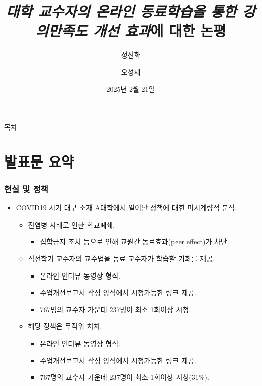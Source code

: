 \documentclass[aspectratio=169,xcolor=dvipsnames,handout]{beamer}
\title{\textit{대학 교수자의 온라인 동료학습을 통한 강의만족도 개선 효과}에 대한 논평}
\subtitle{정진화}
\author{오성재}
\institute[KIHASA]
    {\relax
        2024--25년 SSK 네트워킹 제3차 합동 심포지엄
    }
\date{2025년 2월 21일}
\begin{document}

\frame{\titlepage}

\begin{frame}{목차}
    \tableofcontents
\end{frame}

\section{발표문 요약}

\begin{frame}
    \frametitle{현실 및 정책}
    \begin{itemize}[<+->]
        \item  COVID19 시기 대구 소재 A대학에서 일어난 정책에 대한 미시계량적 분석.
        \begin{itemize}
            \item 전염병 사태로 인한 학교폐쇄.
            \begin{itemize}
               \item 집합금지 조치 등으로 인해 교원간 동료효과(peer effect)가 차단.
            \end{itemize}
            \item 직전학기 교수자의 교수법을 동료 교수자가 학습할 기회를 제공.
            \begin{itemize}
               \item 온라인 인터뷰 동영상 형식.
               \item 수업개선보고서 작성 양식에서 시청가능한 링크 제공.
               \item 767명의 교수자 가운데 237명이 최소 1회이상 시청.
            \end{itemize}
            \item 해당 정책은 무작위 처치.
            \begin{itemize}
               \item 온라인 인터뷰 동영상 형식.
               \item 수업개선보고서 작성 양식에서 시청가능한 링크 제공.
               \item 767명의 교수자 가운데 237명이 최소 1회이상 시청(31\%).
            \end{itemize}
        \end{itemize}
    \end{itemize}
\end{frame}
\end{document}
